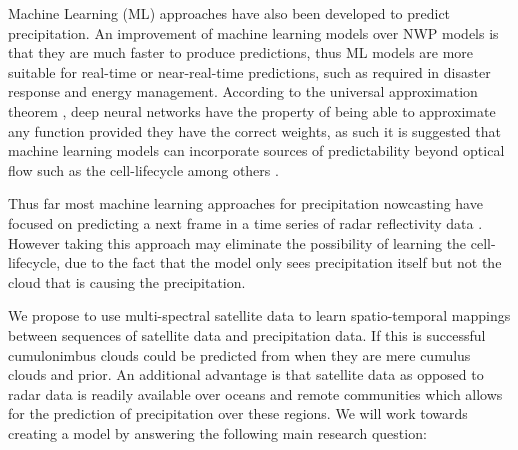 \documentclass[acmtog, authorversion]{acmart}
\begin{document}
Machine Learning (\textsc{ML}) approaches have also been developed to predict precipitation. An improvement of machine learning models over \textsc{NWP} models is that they are much faster to produce predictions, thus ML models are more suitable for real-time or near-real-time predictions, such as required in disaster response and energy management. According to the universal approximation theorem \cite{cybenko-1989}, deep neural networks have the property of being able to approximate any function provided they have the correct weights, as such it is suggested that machine learning models can incorporate sources of predictability beyond optical flow such as the cell-lifecycle among others \cite{prudden2020review}.
\medskip

Thus far most machine learning approaches for precipitation nowcasting have focused on predicting a next frame in a time series of radar reflectivity data \cite{shi2017deep, convlstm, rainet}. However taking this approach may eliminate the possibility of learning the cell-lifecycle, due to the fact that the model only sees precipitation itself but not the cloud that is causing the precipitation.
\medskip


We propose to use multi-spectral satellite data to learn spatio-temporal mappings between sequences of satellite data and precipitation data. If this is successful cumulonimbus clouds could be predicted from when they are mere cumulus clouds and prior. An additional advantage is that satellite data as opposed to radar data is readily available over oceans and remote communities which allows for the prediction of precipitation over these regions. We will work towards creating a model by answering the following main research question:
\smallskip

\end{document}
